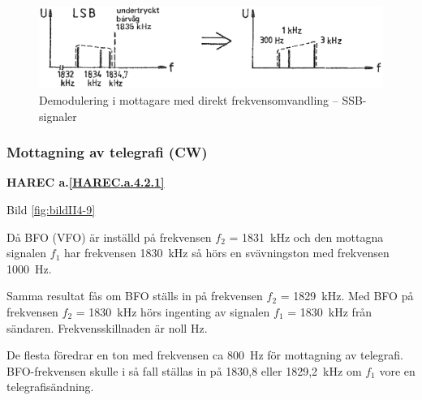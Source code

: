 \begin{figure}
  \includegraphics[width=\textwidth]{images/cropped_pdfs/bild_2_4-10.pdf}
  \caption{Demodulering i mottagare med direkt frekvensomvandling -- SSB-signaler}
  \label{fig:bildII4-10}
\end{figure}

\subsubsection{Mottagning av telegrafi (CW)}
\textbf{HAREC a.\ref{HAREC.a.4.2.1}\label{myHAREC.a.4.2.1}}

Bild \ref{fig:bildII4-9}

Då BFO (VFO) är inställd på frekvensen \(f_2\) = 1831~kHz och den
mottagna signalen \(f_1\) har frekvensen 1830~kHz så hörs en
svävningston med frekvensen 1000~Hz.

Samma resultat fås om BFO ställs in på frekvensen \(f_2\) = 1829~kHz.
Med BFO på frekvensen \(f_2\) = 1830~kHz hörs ingenting av signalen
\(f_1\) = 1830~kHz från sändaren.
Frekvensskillnaden är noll Hz.

De flesta föredrar en ton med frekvensen ca 800~Hz för mottagning av telegrafi.
BFO-frekvensen skulle i så fall ställas in på 1830,8 eller
1829,2~kHz om \(f_1\) vore en telegrafisändning.

